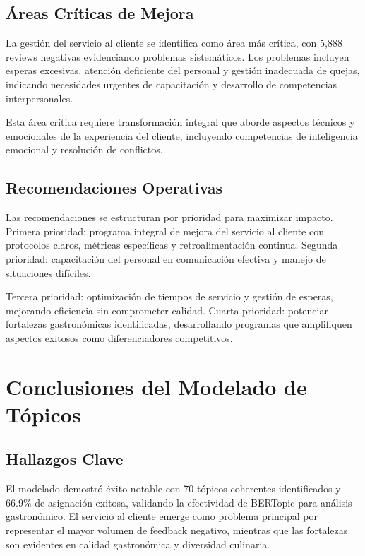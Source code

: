 \documentclass[12pt,a4paper,twoside,openany]{book}
\begin{document}
\subsection{Áreas Críticas de Mejora}

La gestión del servicio al cliente se identifica como área más crítica, con 5,888 reviews negativas evidenciando problemas sistemáticos. Los problemas incluyen esperas excesivas, atención deficiente del personal y gestión inadecuada de quejas, indicando necesidades urgentes de capacitación y desarrollo de competencias interpersonales.

Esta área crítica requiere transformación integral que aborde aspectos técnicos y emocionales de la experiencia del cliente, incluyendo competencias de inteligencia emocional y resolución de conflictos.

\subsection{Recomendaciones Operativas}

Las recomendaciones se estructuran por prioridad para maximizar impacto. Primera prioridad: programa integral de mejora del servicio al cliente con protocolos claros, métricas específicas y retroalimentación continua. Segunda prioridad: capacitación del personal en comunicación efectiva y manejo de situaciones difíciles.

Tercera prioridad: optimización de tiempos de servicio y gestión de esperas, mejorando eficiencia sin comprometer calidad. Cuarta prioridad: potenciar fortalezas gastronómicas identificadas, desarrollando programas que amplifiquen aspectos exitosos como diferenciadores competitivos.

\section{Conclusiones del Modelado de Tópicos}

\subsection{Hallazgos Clave}

El modelado demostró éxito notable con 70 tópicos coherentes identificados y 66.9\% de asignación exitosa, validando la efectividad de BERTopic para análisis gastronómico. El servicio al cliente emerge como problema principal por representar el mayor volumen de feedback negativo, mientras que las fortalezas son evidentes en calidad gastronómica y diversidad culinaria.
\end{document}
